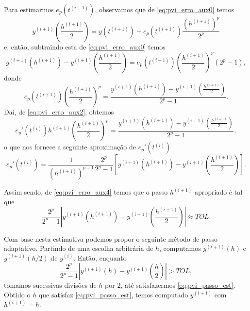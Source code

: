 Para estimarmos $e_p(t^{(i+1)})$, observamos que de \eqref{eq:pvi_erro_aux0} temos
\begin{equation}
  y^{(i+1)}\left(\frac{h^{(i+1)}}{2}\right) = y(t^{(i+1)}) + e_p(t^{(i+1)})\frac{(h^{(i+1)})^p}{2^p}
\end{equation}
e, então, subtraindo esta de \eqref{eq:pvi_erro_aux0} temos
\begin{equation}
  y^{(i+1)}(h^{(i+1)}) - y^{(i+1)}\left(\frac{h^{(i+1)}}{2}\right) = e_p(t^{(i+1)})\left(\frac{h^{(i+1)}}{2}\right)^p(2^p-1),
\end{equation}
donde
\begin{equation}
  e_p(t^{(i+1)})\left(\frac{h^{(i+1)}}{2}\right)^p = \frac{y^{(i+1)}(h^{(i+1)}) - y^{(i+1)}\left(\frac{h^{(i+1)}}{2}\right)}{2^p-1}.
\end{equation}
Daí, de \eqref{eq:pvi_erro_aux2}, obtemos
\begin{equation}
  e_p'(t^{(i)})h^{(i+1)}\left(\frac{h^{(i+1)}}{2}\right)^p = \frac{y^{(i+1)}(h^{(i+1)}) - y^{(i+1)}\left(\frac{h^{(i+1)}}{2}\right)}{2^p-1},
\end{equation}
o que nos fornece a seguinte aproximação de $e_p'(t^{(i)})$
\begin{equation}
  e_p'(t^{(i)}) = \frac{1}{(h^{(i+1)})^{p+1}}\frac{2^p}{2^p-1}\left[y^{(i+1)}(h^{(i+1)}) - y^{(i+1)}\left(\frac{h^{(i+1)}}{2}\right)\right].
\end{equation}

Assim sendo, de \eqref{eq:pvi_erro_aux4} temos que o passo $h^{(i+1)}$ apropriado é tal que
\begin{equation}\label{eq:pvi_passo_est}
  \frac{2^p}{2^p-1}\left|y^{(i+1)}(h^{(i+1)}) - y^{(i+1)}\left(\frac{h^{(i+1)}}{2}\right)\right| \approx TOL.
\end{equation}

Com base nesta estimativa podemos propor o seguinte método de passo adaptativo. Partindo de uma escolha arbitrária de $h$, computamos $y^{(i+1)}(h)$ e $y^{(i+1)}(h/2)$ de  $y^{(i)}$. Então, enquanto
\begin{equation}
  \frac{2^p}{2^p-1}\left|y^{(i+1)}(h) - y^{(i+1)}\left(\frac{h}{2}\right)\right| > TOL,
\end{equation}
tomamos sucessivas divisões de $h$ por $2$, até satisfazermos \eqref{eq:pvi_passo_est}. Obtido o $h$ que satisfaz \eqref{eq:pvi_passo_est}, temos computado $y^{(i+1)}$ com $h^{(i+1)}=h$.

